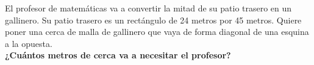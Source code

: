 El profesor de matemáticas va a convertir la mitad de su patio trasero en un gallinero.
Su patio trasero es un rectángulo de 24 metros por 45 metros.
Quiere poner una cerca de malla de gallinero que vaya de forma diagonal de una esquina a la opuesta.\\
\textbf{¿Cuántos metros de cerca va a necesitar el profesor?}